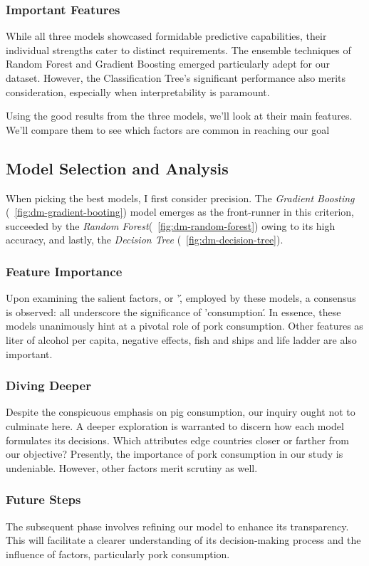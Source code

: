             \subsubsection{Important Features}
                While all three models showcased formidable predictive capabilities, their individual strengths cater to distinct requirements. The ensemble techniques of Random Forest and Gradient Boosting emerged particularly adept for our dataset. However, the Classification Tree's significant performance also merits consideration, especially when interpretability is paramount.

                Using the good results from the three models, we'll look at their main features. We'll compare them to see which factors are common in reaching our goal

        \subsection{Model Selection and Analysis}

            When picking the best models, I first consider precision. The \textit{Gradient Boosting} (\figurename~\ref{fig:dm-gradient-booting}) model emerges as the front-runner in this criterion, succeeded by the \textit{Random Forest}(\figurename~\ref{fig:dm-random-forest}) owing to its high accuracy, and lastly, the \textit{Decision Tree} (\figurename~\ref{fig:dm-decision-tree}).

            \subsubsection{Feature Importance}

                Upon examining the salient factors, or '\features\', employed by these models, a consensus is observed: all underscore the significance of '\pig consumption\'. In essence, these models unanimously hint at a pivotal role of pork consumption. Other features as liter of alcohol per capita, negative effects, fish and ships and life ladder are also important.

            \subsubsection{Diving Deeper}

                Despite the conspicuous emphasis on pig consumption, our inquiry ought not to culminate here. A deeper exploration is warranted to discern how each model formulates its decisions. Which attributes edge countries closer or farther from our objective? Presently, the importance of pork consumption in our study is undeniable. However, other factors merit scrutiny as well.

            \subsubsection{Future Steps}

                The subsequent phase involves refining our model to enhance its transparency. This will facilitate a clearer understanding of its decision-making process and the influence of factors, particularly pork consumption.
